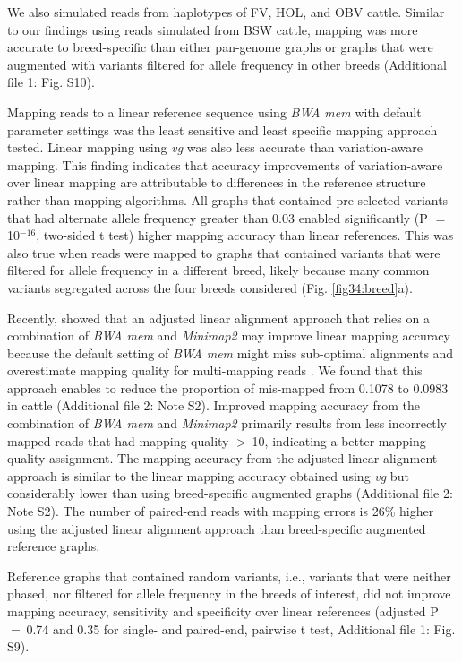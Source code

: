 \documentclass[../main.tex]{subfiles}
\begin{document}
We also simulated reads from haplotypes of FV, HOL, and OBV cattle. Similar to our findings using reads simulated from BSW cattle, mapping was more accurate to breed-specific than either pan-genome graphs or graphs that were augmented with variants filtered for allele frequency in other breeds (Additional file 1: Fig. S10).

Mapping reads to a linear reference sequence using \emph{BWA mem} with default parameter settings was the least sensitive and least specific mapping approach tested. Linear mapping using \emph{vg} was also less accurate than variation-aware mapping. This finding indicates that accuracy improvements of variation-aware over linear mapping are attributable to differences in the reference structure rather than mapping algorithms. All graphs that contained pre-selected variants that had alternate allele frequency greater than 0.03 enabled significantly (P $=$ 10$^{−16}$, two-sided t test) higher mapping accuracy than linear references. This was also true when reads were mapped to graphs that contained variants that were filtered for allele frequency in a different breed, likely because many common variants segregated across the four breeds considered (Fig. \ref{fig34:breed}a).

Recently, \citep{grytten2020assessing} showed that an adjusted linear alignment approach that relies on a combination of \emph{BWA mem} and \emph{Minimap2} \citep{li2018minimap2} may improve linear mapping accuracy because the default setting of \emph{BWA mem} might miss sub-optimal alignments and overestimate mapping quality for multi-mapping reads \citep{grytten2020assessing,li2013aligning}. We found that this approach enables to reduce the proportion of mis-mapped from 0.1078 to 0.0983 in cattle (Additional file 2: Note S2). Improved mapping accuracy from the combination of \emph{BWA mem} and \emph{Minimap2} primarily results from less incorrectly mapped reads that had mapping quality $>$ 10, indicating a better mapping quality assignment. The mapping accuracy from the adjusted linear alignment approach is similar to the linear mapping accuracy obtained using \emph{vg} but considerably lower than using breed-specific augmented graphs (Additional file 2: Note S2). The number of paired-end reads with mapping errors is 26\% higher using the adjusted linear alignment approach than breed-specific augmented reference graphs.

Reference graphs that contained random variants, i.e., variants that were neither phased, nor filtered for allele frequency in the breeds of interest, did not improve mapping accuracy, sensitivity and specificity over linear references (adjusted P $=$ 0.74 and 0.35 for single- and paired-end, pairwise t test, Additional file 1: Fig. S9).
\end{document}
